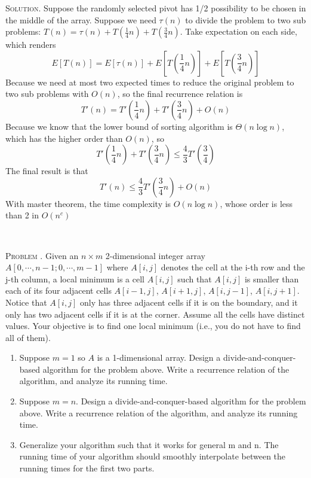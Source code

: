 \documentclass[12pt, a4paper, oneside]{ctexart}
\newcounter{problemname}
\newenvironment{problem}{\stepcounter{problemname}\par\noindent\textsc{Problem \arabic{problemname}. }}{\\\par}
\newenvironment{solution}{\par\noindent\textsc{Solution. }}{\\\par}
\begin{document}
\begin{solution}
    Suppose the randomly selected pivot has 1/2 possibility to be chosen in the middle of the array. Suppose we need $\tau(n)$ to divide the problem to two sub problems: $T(n) = \tau(n) + T(\frac{1}{4}n) + T(\frac{3}{4}n)$. Take expectation on each side, which renders 
    $$E[T(n)] = E[\tau(n)] + E[T(\frac{1}{4}n)] + E[T(\frac{3}{4}n)]$$
    Because we need at most two expected times to reduce the original problem to two sub problems with $O(n)$, so the final recurrence relation is 
    $$T'(n) = T'(\frac{1}{4}n) + T'(\frac{3}{4}n) + O(n)$$
    Because we know that the lower bound of sorting algorithm is $\Theta(n\log n)$, which has the higher order than $O(n)$, so 
    $$T'(\frac{1}{4}n) + T'(\frac{3}{4}n) \leq \frac{4}{3}T'(\frac{3}{4})$$
    The final result is that 
    $$T'(n) \leq \frac{4}{3}T'(\frac{3}{4}n) + O(n) $$
    With master theorem, the time complexity is $O(n\log n)$, whose order is less than 2 in $O(n^c)$

\end{solution}

\begin{problem}
    Given an $n×m$ 2-dimensional integer array\\ 
    $A[0,\cdots , n−1; 0, \cdots,m−1]$ where $A[i, j]$ denotes the cell at the i-th row and the j-th column, a local minimum is a cell $A[i, j]$ such that $A[i, j]$ is smaller than each of its four adjacent cells $A[i−1, j]$, $A[i+ 1, j]$, $A[i, j −1]$, $A[i, j + 1]$. Notice that $A[i, j]$ only has three adjacent cells if it is on the boundary, and it only has two adjacent cells if it is at the corner. Assume all the cells have distinct values. Your objective is to find one local minimum (i.e., you do not have
to find all of them).
    \begin{enumerate}
        \item Suppose $m = 1$ so $A$ is a 1-dimensional array. Design a divide-and-conquer-based algorithm for the problem above. Write a recurrence relation of the
algorithm, and analyze its running time.
        \item Suppose $m = n$. Design a divide-and-conquer-based algorithm for the problem above. Write a recurrence relation of the algorithm, and analyze its
running time.
        \item Generalize your algorithm such that it works for general m and n. The running time of your algorithm should smoothly interpolate between the
running times for the first two parts.
    \end{enumerate}
\end{problem}
\end{document}
